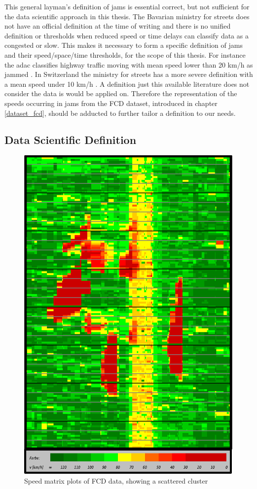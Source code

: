 \documentclass[a4paper,headsepline,footsepline,fontsize=11pt,BCOR=12mm,DIV=12]{report}
\begin{document}
This general layman's definition of jams is essential correct, but not sufficient for the data scientific approach in this thesis. The Bavarian ministry for streets does not have an official definition at the time of writing and there is no unified definition or thresholds when reduced speed or time delays can classify data as a congested or slow. This makes it necessary to form a specific definition of \glspl{jam} and their speed/space/time thresholds, for the scope of this thesis. For instance the \acrshort{adac} classifies highway traffic moving with mean speed lower than 20 km/h as jammed \cite{ADAC2019}. In Switzerland the ministry for streets has a more severe definition with a mean speed under 10 km/h \cite{ASTRA2020}. A definition just this available literature does not consider the data is would be applied on. Therefore the representation of the speeds occurring in jams from the FCD dataset, introduced in chapter \ref{dataset_fcd}, should be adducted to further tailor a definition to our needs. 

\subsection{Data Scientific Definition}

\begin{figure}[h]
	\centering
	\includegraphics[scale=0.8]{./assets/SpeedMatrixPlot_single}
	\caption{Speed matrix plots of FCD data, showing a scattered cluster}
	\label{img:speedMatrixPlot_singleCluster}
\end{figure}
\end{document}
